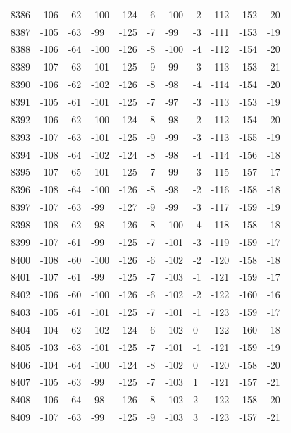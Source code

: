 \begin{table}[H]
\begin{tabular}{lllllllllll}
8386 & -106 & -62 & -100 & -124 & -6 & -100 & -2 & -112 & -152 & -20 \\
8387 & -105 & -63 & -99 & -125 & -7 & -99 & -3 & -111 & -153 & -19 \\
8388 & -106 & -64 & -100 & -126 & -8 & -100 & -4 & -112 & -154 & -20 \\
8389 & -107 & -63 & -101 & -125 & -9 & -99 & -3 & -113 & -153 & -21 \\
8390 & -106 & -62 & -102 & -126 & -8 & -98 & -4 & -114 & -154 & -20 \\
8391 & -105 & -61 & -101 & -125 & -7 & -97 & -3 & -113 & -153 & -19 \\
8392 & -106 & -62 & -100 & -124 & -8 & -98 & -2 & -112 & -154 & -20 \\
8393 & -107 & -63 & -101 & -125 & -9 & -99 & -3 & -113 & -155 & -19 \\
8394 & -108 & -64 & -102 & -124 & -8 & -98 & -4 & -114 & -156 & -18 \\
8395 & -107 & -65 & -101 & -125 & -7 & -99 & -3 & -115 & -157 & -17 \\
8396 & -108 & -64 & -100 & -126 & -8 & -98 & -2 & -116 & -158 & -18 \\
8397 & -107 & -63 & -99 & -127 & -9 & -99 & -3 & -117 & -159 & -19 \\
8398 & -108 & -62 & -98 & -126 & -8 & -100 & -4 & -118 & -158 & -18 \\
8399 & -107 & -61 & -99 & -125 & -7 & -101 & -3 & -119 & -159 & -17 \\
8400 & -108 & -60 & -100 & -126 & -6 & -102 & -2 & -120 & -158 & -18 \\
8401 & -107 & -61 & -99 & -125 & -7 & -103 & -1 & -121 & -159 & -17 \\
8402 & -106 & -60 & -100 & -126 & -6 & -102 & -2 & -122 & -160 & -16 \\
8403 & -105 & -61 & -101 & -125 & -7 & -101 & -1 & -123 & -159 & -17 \\
8404 & -104 & -62 & -102 & -124 & -6 & -102 & 0 & -122 & -160 & -18 \\
8405 & -103 & -63 & -101 & -125 & -7 & -101 & -1 & -121 & -159 & -19 \\
8406 & -104 & -64 & -100 & -124 & -8 & -102 & 0 & -120 & -158 & -20 \\
8407 & -105 & -63 & -99 & -125 & -7 & -103 & 1 & -121 & -157 & -21 \\
8408 & -106 & -64 & -98 & -126 & -8 & -102 & 2 & -122 & -158 & -20 \\
8409 & -107 & -63 & -99 & -125 & -9 & -103 & 3 & -123 & -157 & -21 \\

\end{tabular}
\end{table}
